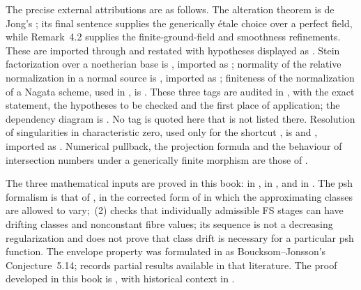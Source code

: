 The precise external attributions are as follows.  The alteration theorem is
de Jong's \cite[Theorem~4.1]{deJong1996}; its final sentence supplies the
generically étale choice over a perfect field, while Remark~4.2 supplies the
finite-ground-field and smoothness refinements.  These are imported through
 and restated with hypotheses displayed as
.  Stein factorization over a
noetherian base is
\cite[\href{https://stacks.math.columbia.edu/tag/03H0}{Tag 03H0}]
{stacks-project}, imported as ; normality
of the relative normalization in a normal source is
\cite[\href{https://stacks.math.columbia.edu/tag/035L}{Tag 035L}]
{stacks-project}, imported as ; finiteness of
the normalization of a Nagata scheme, used in
, is
\cite[\href{https://stacks.math.columbia.edu/tag/035S}{Tag 035S}]
{stacks-project}.  These three tags are audited in , with
the exact statement, the hypotheses to be checked and the first place of
application; the dependency diagram is .
No tag is quoted here that is not listed there.  Resolution of singularities
in characteristic zero, used only for the shortcut
, is \cite{Hironaka1964I} and
\cite{Hironaka1964II}, imported as .  Numerical
pullback, the projection formula and the behaviour of intersection numbers
under a generically finite morphism are those of
.

The three mathematical inputs are proved in this book:
 in ,
 in , and
 in .  The
psh formalism is that of \cite{BJ22}, in the corrected form of
 in which the approximating classes are allowed to vary;
\,(2) checks that individually admissible
FS stages can have drifting classes and nonconstant fibre values;
its sequence is not a decreasing regularization and does not prove
that class drift is necessary for a particular psh function.  The envelope property
was formulated in \cite{BJ22} as Boucksom--Jonsson's Conjecture~5.14;
\cite{BJ22b} records partial results available in that literature.  The proof
developed in this book is , with historical
context in .

